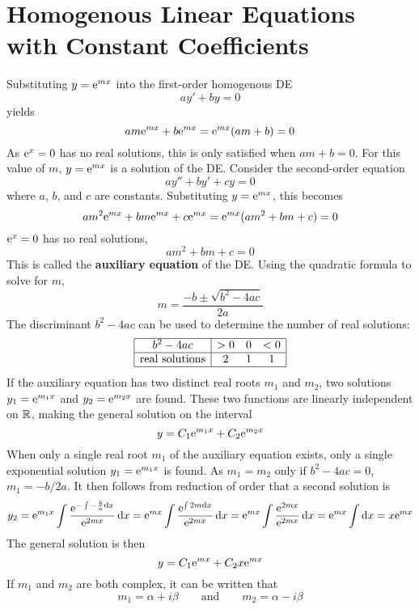 \documentclass[./Differential Equations]{subfiles}
\begin{document}
	\section{Homogenous Linear Equations with Constant Coefficients}
		Substituting \(y = \text{e}^{mx}\) into the first-order homogenous DE
			\[ay' + by = 0\]
			yields
			\[am\text{e}^{mx} + b\text{e}^{mx} = \text{e}^{mx}(am + b) = 0\]
			As \(\text{e}^{x} = 0\) has no real solutions, this is only satisfied when \(am + b = 0\). For this value of \(m\), \(y = \text{e}^{mx}\) is a solution of the DE.
			Consider the second-order equation
				\[ay'' + by' + cy = 0\]
				where \(a\), \(b\), and \(c\) are constants. Substituting \(y = \text{e}^{mx}\), this becomes
				\[am^2\text{e}^{mx} + bm\text{e}^{mx} + c\text{e}^{mx} = \text{e}^{mx}(am^2 + bm + c) = 0\]
				\(\text{e}^{x} = 0\) has no real solutions, 
				\[am^2 + bm + c = 0\]
				This is called the \textbf{auxiliary equation} of the DE. Using the quadratic formula to solve for \(m\),
				\[m = \frac{-b \pm \sqrt{b^2 - 4ac}}{2a}\]
				The discriminant \(b^2 - 4ac\) can be used to determine the number of real solutions:
				\[\begin{array}{|c|ccc|}\hline
					b^2 - 4ac & > 0 & 0 & < 0 \\\hline
					\text{real solutions} & 2 & 1 & 1 \\\hline
				\end{array}\]
				If the auxiliary equation has two distinct real roots \(m_1\) and \(m_2\), two solutions \(y_1 = \text{e}^{m_1x}\) and \(y_2 = \text{e}^{m_2x}\) are found. These two functions are linearly independent on \(\mathbb{R}\), making the general solution on the interval
					\[y = C_1\text{e}^{m_1x} + C_2\text{e}^{m_2x}\]
				When only a single real root \(m_1\) of the auxiliary equation exists, only a single exponential solution \(y_1 = \text{e}^{m_1x}\) is found. As \(m_1 = m_2\) only if \(b^2 - 4ac = 0\), \(m_1 = -b/2a\). It then follows from reduction of order that a second solution is
					\[
						y_2 = \text{e}^{m_1x}\int \frac{\text{e}^{-\int -\frac{b}{a} \dd{x}}}{\text{e}^{2mx}} \dd{x}
								= \text{e}^{mx}\int \frac{\text{e}^{\int 2m \dd{x}}}{\text{e}^{2mx}} \dd{x}
								= \text{e}^{mx}\int \frac{\text{e}^{2mx}}{\text{e}^{2mx}} \dd{x}
								= \text{e}^{mx}\int \dd{x}
								= x\text{e}^{mx}
					\]
					The general solution is then
					\[y = C_1\text{e}^{mx} + C_2x\text{e}^{mx}\]
				If \(m_1\) and \(m_2\) are both complex, it can be written that
					\[
						m_1 = \alpha + i\beta \qquad \text{and} \qquad
								m_2 = \alpha - i\beta
					\]
\end{document}
